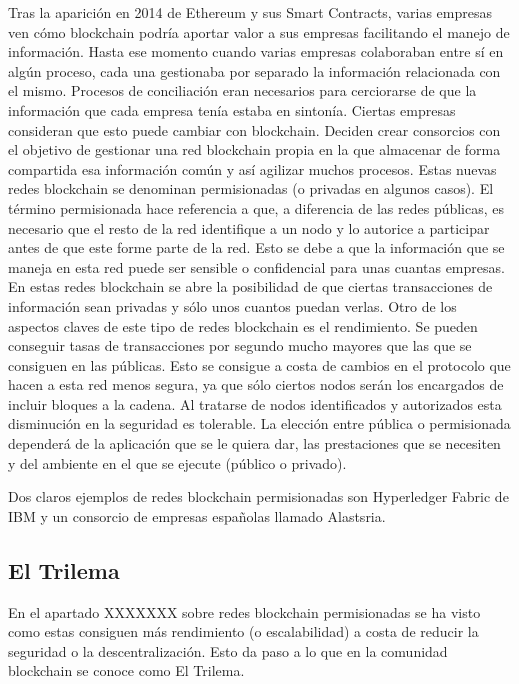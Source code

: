 Tras la aparición en 2014 de Ethereum y sus Smart Contracts, varias empresas ven cómo blockchain podría aportar valor a sus empresas facilitando el manejo de información. Hasta ese momento cuando varias empresas colaboraban entre sí en algún proceso, cada una gestionaba por separado la información relacionada con el mismo. Procesos de conciliación eran necesarios para cerciorarse de que la información que cada empresa tenía estaba en sintonía. Ciertas empresas consideran que esto puede cambiar con blockchain. Deciden crear consorcios con el objetivo de gestionar una red blockchain propia en la que almacenar de forma compartida esa información común y así agilizar muchos procesos.
Estas nuevas redes blockchain se denominan permisionadas (o privadas en algunos casos). El término permisionada hace referencia a que, a diferencia de las redes públicas, es necesario que el resto de la red identifique a un nodo y lo autorice a participar antes de que este forme parte de la red. Esto se debe a que la información que se maneja en esta red puede ser sensible o confidencial para unas cuantas empresas. En estas redes blockchain se abre la posibilidad de que ciertas transacciones de información sean privadas y sólo unos cuantos puedan verlas. Otro de los aspectos claves de este tipo de redes blockchain es el rendimiento. Se pueden conseguir tasas de transacciones por segundo mucho mayores que las que se consiguen en las públicas. Esto se consigue a costa de cambios en el protocolo que hacen a esta red menos segura, ya que sólo ciertos nodos serán los encargados de incluir bloques a la cadena. Al tratarse de nodos identificados y autorizados esta disminución en la seguridad es tolerable. La elección entre pública o permisionada dependerá de la aplicación que se le quiera dar, las prestaciones que se necesiten y del ambiente en el que se ejecute (público o privado). \newline

Dos claros ejemplos de redes blockchain permisionadas son Hyperledger Fabric de IBM y un consorcio de empresas españolas llamado Alastsria.

\subsection{El Trilema}

En el apartado XXXXXXX sobre redes blockchain permisionadas se ha visto como estas consiguen más rendimiento (o escalabilidad) a costa de reducir la seguridad o la descentralización. Esto da paso a lo que en la comunidad blockchain se conoce como El Trilema.\newline

